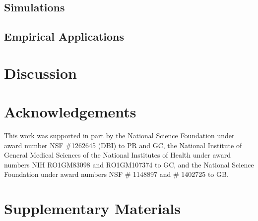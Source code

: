 \documentclass[12pt]{article}
\begin{document}
\subsection*{Simulations}

\subsection*{Empirical Applications}

\section*{Discussion}

\section*{Acknowledgements}

This work was supported in part by 
the National Science Foundation under award number NSF \#1262645 (DBI) to PR and GC, 
the National Institute of General Medical Sciences of the National Institutes of Health under award numbers NIH RO1GM83098 and RO1GM107374 to GC,
and the National Science Foundation under award numbers NSF \# 1148897 and \# 1402725 to GB.


\newpage



\newpage

\section*{Supplementary Materials}
\renewcommand{\thefigure}{S\arabic{figure}}
\setcounter{figure}{0}
\renewcommand{\thetable}{S\arabic{table}}
\setcounter{table}{0}
\renewcommand{\theequation}{S\arabic{table}}
\setcounter{equation}{0}
\end{document}
